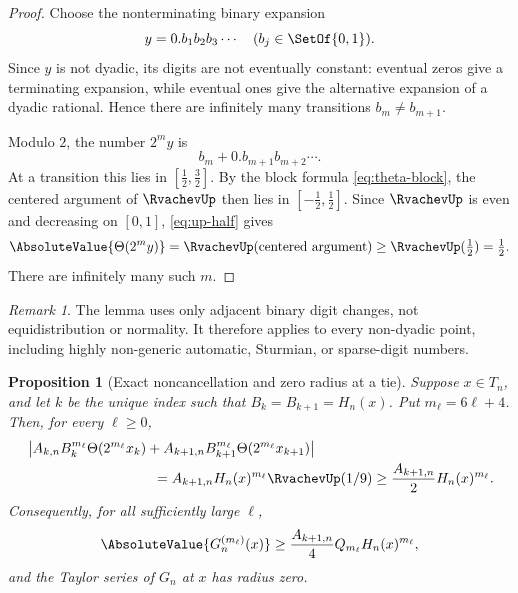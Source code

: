 \documentclass[11pt,oneside]{article}
\newtheorem{proposition}[theorem]{Proposition}
\theoremstyle{definition}
\theoremstyle{remark}
\newtheorem{remark}[theorem]{Remark}
\newcommand{\ThetaF}{\Theta}
\newcommand{\half}{\tfrac12}
\begin{document}
\begin{proof}
Choose the nonterminating binary expansion
\[
 y=0.b_1b_2b_3\cdots\quad(b_j\in\SetOf{0,1}).
\]
Since $y$ is not dyadic, its digits are not eventually constant: eventual zeros give
a terminating expansion, while eventual ones give the alternative expansion of a
dyadic rational.  Hence there are infinitely many transitions
$b_m\neq b_{m+1}$.

Modulo $2$, the number $2^m y$ is
\[
 b_m+0.b_{m+1}b_{m+2}\cdots.
\]
At a transition this lies in $[\half,\tfrac32]$.  By the block formula
\eqref{eq:theta-block}, the centered argument of $\RvachevUp$ then lies in
$[-\half,\half]$.  Since $\RvachevUp$ is even and decreasing on $[0,1]$,
\eqref{eq:up-half} gives
\[
 \AbsoluteValue{\ThetaF(2^m y)}
 =\RvachevUp(\text{centered argument})\geq\RvachevUp(\half)=\half.
\]
There are infinitely many such $m$.
\end{proof}

\begin{remark}
The lemma uses only adjacent binary digit changes, not equidistribution or normality.
It therefore applies to every non-dyadic point, including highly non-generic automatic,
Sturmian, or sparse-digit numbers.
\end{remark}

\begin{proposition}[Exact noncancellation and zero radius at a tie]
\label{prop:tie-noncancellation}
Suppose $x\in T_n$, and let $k$ be the unique index such that
$B_k=B_{k+1}=H_n(x)$.  Put $m_\ell=6\ell+4$.  Then, for every $\ell\geq0$,
\begin{align}
 &\left|
 A_{k,n}B_k^{m_\ell}\ThetaF(2^{m_\ell}x_k)
 +A_{k+1,n}B_{k+1}^{m_\ell}\ThetaF(2^{m_\ell}x_{k+1})
 \right| \notag\\
 &\hspace{32mm}={}
 A_{k+1,n}H_n(x)^{m_\ell}\RvachevUp(1/9)
 \geq \frac{A_{k+1,n}}2H_n(x)^{m_\ell}.
 \label{eq:tie-noncancellation}
\end{align}
Consequently, for all sufficiently large $\ell$,
\begin{equation}
 \AbsoluteValue{G_n^{(m_\ell)}(x)}
 \geq \frac{A_{k+1,n}}4Q_{m_\ell}H_n(x)^{m_\ell},
 \label{eq:tie-derivative-lower-bound}
\end{equation}
and the Taylor series of $G_n$ at $x$ has radius zero.
\end{proposition}
\end{document}
